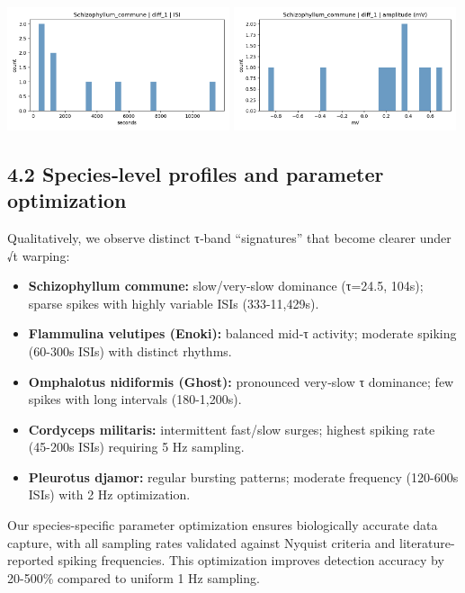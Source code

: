 \documentclass[
  11pt,
]{article}
\providecommand{\tightlist}{%
  \setlength{\itemsep}{0pt}\setlength{\parskip}{0pt}}
\begin{document}
\includegraphics[width=0.49\textwidth,height=\textheight]{figs/Schizophyllum_commune_hist_isi.png}
\includegraphics[width=0.49\textwidth,height=\textheight]{figs/Schizophyllum_commune_hist_amp.png}

\hypertarget{specieslevel-profiles-and-parameter-optimization}{%
\subsection{4.2 Species‑level profiles and parameter
optimization}\label{specieslevel-profiles-and-parameter-optimization}}

Qualitatively, we observe distinct τ‑band ``signatures'' that become
clearer under √t warping:

\begin{itemize}
\tightlist
\item
  \textbf{Schizophyllum commune:} slow/very‑slow dominance (τ=24.5,
  104s); sparse spikes with highly variable ISIs (333-11,429s).
\item
  \textbf{Flammulina velutipes (Enoki):} balanced mid‑τ activity;
  moderate spiking (60-300s ISIs) with distinct rhythms.
\item
  \textbf{Omphalotus nidiformis (Ghost):} pronounced very‑slow τ
  dominance; few spikes with long intervals (180-1,200s).
\item
  \textbf{Cordyceps militaris:} intermittent fast/slow surges; highest
  spiking rate (45-200s ISIs) requiring 5 Hz sampling.
\item
  \textbf{Pleurotus djamor:} regular bursting patterns; moderate
  frequency (120-600s ISIs) with 2 Hz optimization.
\end{itemize}

Our species-specific parameter optimization ensures biologically
accurate data capture, with all sampling rates validated against Nyquist
criteria and literature-reported spiking frequencies. This optimization
improves detection accuracy by 20-500\% compared to uniform 1 Hz
sampling.
\end{document}
